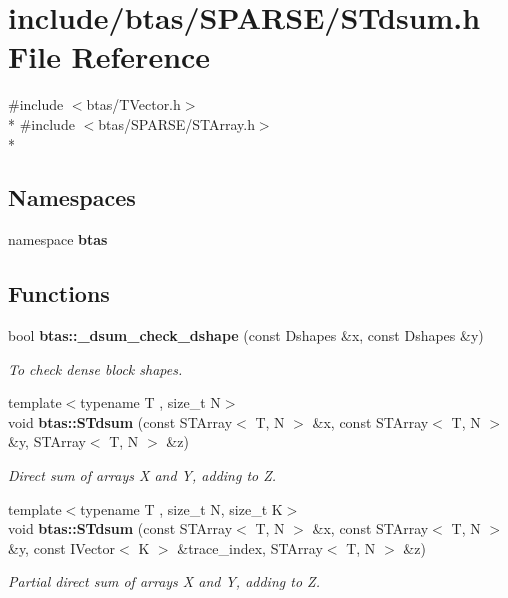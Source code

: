 \section{include/btas/\-S\-P\-A\-R\-S\-E/\-S\-Tdsum.h File Reference}
\label{d9/dc3/STdsum_8h}
{\ttfamily \#include $<$btas/\-T\-Vector.\-h$>$}\\*
{\ttfamily \#include $<$btas/\-S\-P\-A\-R\-S\-E/\-S\-T\-Array.\-h$>$}\\*
\subsection*{Namespaces}
\begin{DoxyCompactItemize}
\item 
namespace {\bf btas}
\end{DoxyCompactItemize}
\subsection*{Functions}
\begin{DoxyCompactItemize}
\item 
bool {\bf btas\-::\-\_\-dsum\-\_\-check\-\_\-dshape} (const Dshapes \&x, const Dshapes \&y)
\begin{DoxyCompactList}\small\item\em To check dense block shapes. \end{DoxyCompactList}\item 
{\footnotesize template$<$typename T , size\-\_\-t N$>$ }\\void {\bf btas\-::\-S\-Tdsum} (const S\-T\-Array$<$ T, N $>$ \&x, const S\-T\-Array$<$ T, N $>$ \&y, S\-T\-Array$<$ T, N $>$ \&z)
\begin{DoxyCompactList}\small\item\em Direct sum of arrays X and Y, adding to Z. \end{DoxyCompactList}\item 
{\footnotesize template$<$typename T , size\-\_\-t N, size\-\_\-t K$>$ }\\void {\bf btas\-::\-S\-Tdsum} (const S\-T\-Array$<$ T, N $>$ \&x, const S\-T\-Array$<$ T, N $>$ \&y, const I\-Vector$<$ K $>$ \&trace\-\_\-index, S\-T\-Array$<$ T, N $>$ \&z)
\begin{DoxyCompactList}\small\item\em Partial direct sum of arrays X and Y, adding to Z. \end{DoxyCompactList}\end{DoxyCompactItemize}
